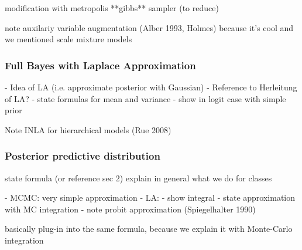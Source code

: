 modification with metropolis **gibbs** sampler (to reduce)

note auxilariy variable augmentation (Alber 1993, Holmes) because it's cool and we mentioned scale mixture models


\subsubsection*{Full Bayes with Laplace Approximation}

- Idea of LA (i.e. approximate posterior with Gaussian)
- Reference to Herleitung of LA?
- state formulas for mean and variance
- show in logit case with simple prior

Note INLA for hierarchical models (Rue 2008)



\subsubsection*{Posterior predictive distribution}

state formula (or reference sec 2)
explain in general what we do for classes

- MCMC: very simple approximation
- LA:
    - show integral
    - state approximation with MC integration
    - note probit approximation (Spiegelhalter 1990)

basically plug-in into the same formula, because we explain it with Monte-Carlo integration

